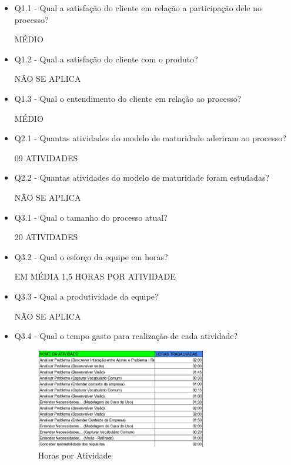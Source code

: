 \begin{itemize}
\item Q1.1 - Qual a satisfação do cliente em relação a participação dele no processo?

MÉDIO

\item Q1.2 - Qual a satisfação do cliente com o produto?

NÃO SE APLICA

\item Q1.3 - Qual o entendimento do cliente em relação ao processo?

MÉDIO

\item Q2.1 - Quantas atividades do modelo de maturidade aderiram ao processo?

09 ATIVIDADES

\item Q2.2 - Quantas atividades do modelo de maturidade foram estudadas?

NÃO SE APLICA

\item Q3.1 - Qual o tamanho do processo atual?

20 ATIVIDADES

\item Q3.2 - Qual o esforço da equipe em horas?

EM MÉDIA 1,5 HORAS POR ATIVIDADE

\item Q3.3 - Qual a produtividade da equipe?

NÃO SE APLICA

\item Q3.4 - Qual o tempo gasto para realização de cada atividade?


\begin{figure}[H]
  \center
  \includegraphics[width=0.7\textwidth]{figuras/tempo-atv2}
  \caption{Horas por Atividade}
  \label{fig:tempo-atv2}
\end{figure}


\end{itemize}
